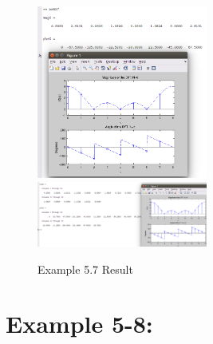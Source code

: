 \documentclass[11pt
  , a4paper
  , article
  , oneside
]{memoir}
\begin{document}
\begin{figure}[h!]
	\centering
	\includegraphics[width=0.5\textwidth,height=0.4\textwidth]{./images/ex507a.png}
	\includegraphics[width=0.5\textwidth,height=0.4\textwidth]{./images/ex507b.png}
	\caption{Example 5.7 Result}
	\label{fig:Example 5.7 Result}
\end{figure}

\chapter{Example 5-8:}
\end{document}

